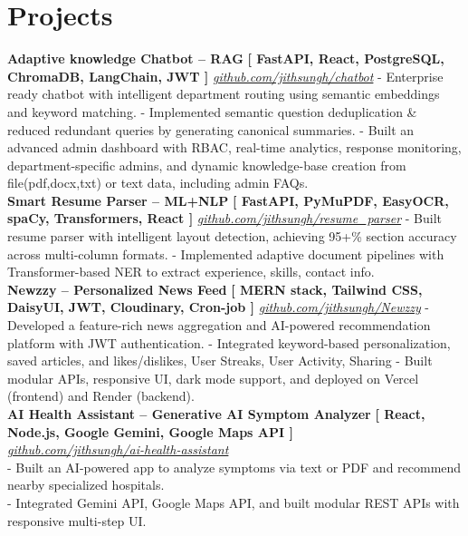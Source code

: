 \documentclass[a4paper,10pt]{article}
\begin{document}
\section*{Projects}
\textbf{Adaptive knowledge Chatbot – RAG} \hfill \textbf{[ FastAPI, React, PostgreSQL, ChromaDB, LangChain, JWT ]} \newline
\textit{\href{https://github.com/jithsungh/chatbot}{github.com/jithsungh/chatbot}} \newline
- Enterprise ready chatbot with intelligent department routing using semantic embeddings and keyword matching. \newline
- Implemented semantic question deduplication \& reduced redundant queries by generating canonical summaries.\newline
- Built an advanced admin dashboard with RBAC, real-time analytics, response monitoring, department-specific admins, and dynamic knowledge-base creation from file(pdf,docx,txt) or text data, including admin FAQs.\\[0.5em]
\textbf{Smart Resume Parser – ML+NLP} \hfill \textbf{[ FastAPI, PyMuPDF, EasyOCR, spaCy, Transformers, React ]} \newline
\textit{\href{https://github.com/jithsungh/resume_parser}{github.com/jithsungh/resume\_parser}} \newline
- Built resume parser with intelligent layout detection, achieving 95+\% section accuracy across multi-column formats. \newline
- Implemented adaptive document pipelines with Transformer-based NER to extract experience, skills, contact info.\\[0.5em]
\textbf{Newzzy – Personalized News Feed} \hfill \textbf{[ MERN stack, Tailwind CSS, DaisyUI, JWT, Cloudinary, Cron-job ]} \newline
\textit{\href{https://github.com/jithsungh/Newzzy}{github.com/jithsungh/Newzzy}} \newline
- Developed a feature-rich news aggregation and AI-powered recommendation platform with JWT authentication. \newline
- Integrated keyword-based personalization, saved articles, and likes/dislikes, User Streaks, User Activity, Sharing \newline
- Built modular APIs, responsive UI, dark mode support, and deployed on Vercel (frontend) and Render (backend).\\[0.5em]
\textbf{AI Health Assistant – Generative AI Symptom Analyzer} \hfill \textbf{[ React, Node.js, Google Gemini, Google Maps API ]} \\
\textit{\href{https://github.com/jithsungh/ai-health-assistant}{github.com/jithsungh/ai-health-assistant}} \\
- Built an AI-powered app to analyze symptoms via text or PDF and recommend nearby specialized hospitals.\\
- Integrated Gemini API, Google Maps API, and built modular REST APIs with responsive multi-step UI.
\end{document}
